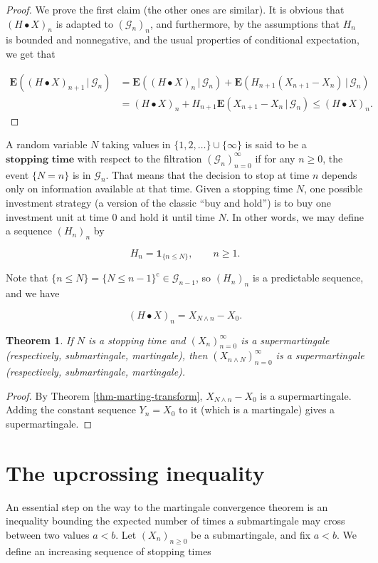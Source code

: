 \documentclass[11pt]{report}
\theoremstyle{plain}
\newtheorem{thm}{Theorem}[chapter]
\theoremstyle{definition}
\begin{document}
\begin{proof}
We prove the first claim (the other ones are similar). It is obvious that $(H\bullet X)_n$ is adapted to $(\mathcal{G}_n)_n$, and furthermore, by the assumptions that $H_n$ is bounded and nonnegative, and the usual properties of conditional expectation, we get that

\begin{align*}
\mathbf{E}\left((H\bullet X)_{n+1}\,|\,\mathcal{G}_n\right) &=
\mathbf{E}\left((H\bullet X)_{n}\,|\,\mathcal{G}_n\right) +
\mathbf{E}\left(H_{n+1}(X_{n+1}-X_n)\,|\,\mathcal{G}_n\right) \\
&= (H\bullet X)_n +
H_{n+1} \mathbf{E}\left(X_{n+1}-X_n\,|\,\mathcal{G}_n\right) \le (H\bullet X)_n.
\end{align*}

\end{proof}

A random variable $N$ taking values in $\{1,2,\ldots\}\cup \{\infty\}$ is said to be a $\textbf{stopping time}$ with respect to the filtration $(\mathcal{G}_n)_{n=0}^\infty$ if for any $n\ge0$, the event $\{ N=n \}$ is in $\mathcal{G}_n$. That means that the decision to stop at time $n$ depends only on information available at that time. Given a stopping time $N$, one possible investment strategy (a version of the classic ``buy and hold'') is to buy one investment unit at time $0$ and hold it until time $N$. In other words, we may define a sequence $(H_n)_n$ by

\[
H_n = \mathbf{1}_{\{n\le N\}}, \qquad n\ge 1.
\]

Note that $\{ n\le N\} = \{N\le n-1\}^\textrm{c} \in \mathcal{G}_{n-1}$, so $(H_n)_n$ is a predictable sequence, and we have

\[
(H\bullet X)_n = X_{N\wedge n} - X_0.
\]

\begin{thm}
\label{thm-stopping-mart}
If $N$ is a stopping time and $(X_n)_{n=0}^\infty$ is a supermartingale (respectively, submartingale, martingale), then $(X_{n\wedge N})_{n=0}^\infty$ is a supermartingale (respectively, submartingale, martingale).
\end{thm}

\begin{proof}
By Theorem \ref{thm-marting-transform}, $X_{N\wedge n} - X_0$ is a supermartingale. Adding the constant sequence $Y_n=X_0$ to it (which is a martingale) gives a supermartingale.
\end{proof}

\section{The upcrossing inequality}
An essential step on the way to the martingale convergence theorem is an inequality bounding the expected number of times a submartingale may cross between two values $a<b$. Let $(X_n)_{n\ge 0}$ be a submartingale, and fix $a<b$. We define an increasing sequence of stopping times
\end{document}

